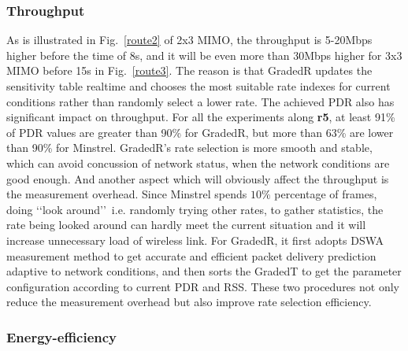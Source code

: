 \documentclass[draftclsnofoot,conference,onecolumn,11pt]{IEEEtran}
\begin{document}
\subsubsection{Throughput}
As is illustrated in Fig.~\ref{route2} of 2x3 MIMO, the throughput is 5-20Mbps higher before the time of 8s, and it will be even more than 30Mbps higher for 3x3 MIMO before 15s in Fig.~\ref{route3}. The reason is that GradedR updates the sensitivity table realtime and chooses the most suitable rate indexes for current conditions rather than randomly select a lower rate. The achieved PDR also has significant impact on throughput. For all the experiments along \textbf{r5}, at least 91\% of PDR values are greater than 90\% for GradedR, but more than 63\% are lower than 90\% for Minstrel. GradedR's rate selection is more smooth and stable, which can avoid concussion of network status, when the network conditions are good enough. And another aspect which will obviously affect the throughput is the measurement overhead. Since Minstrel spends $10\%$ percentage of frames, doing \lq\lq look around\rq\rq~i.e. randomly trying other rates, to gather statistics, the rate being looked around can hardly meet the current situation and it will increase unnecessary load of wireless link. For GradedR, it first adopts DSWA measurement method to get accurate and efficient packet delivery prediction adaptive to network conditions, and then sorts the GradedT to get the parameter configuration according to current PDR and RSS. These two procedures not only reduce the measurement overhead but also improve rate selection efficiency.
\subsubsection{Energy-efficiency}



\renewcommand\refname{References}
%


\end{document}

